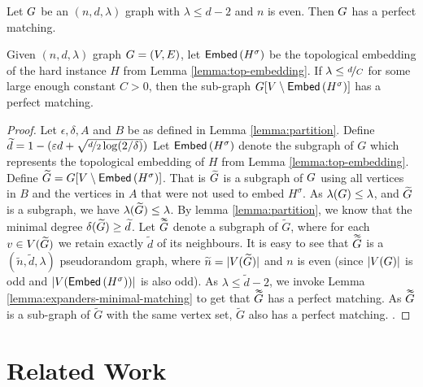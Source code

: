 \documentclass[11pt]{article}
\newcommand{\EnDeeLambda}{(n, d, \lambda)}
\newcommand{\Subdivision}[2]{{#1}^{#2}}
\newcommand{\MinimalDegree}[1]{\delta(#1)}
\newcommand{\dbtilde}[1]{\tilde{\raisebox{0pt}[0.85\height]{$\tilde{#1}$}}}
\newcommand{\ExpansionFactor}[1]{\lambda(#1)}
\begin{document}
\begin{lemma}\label{lemma:expanders-minimal-matching}
Let $\Graph$ be an $\EnDeeLambda$ graph with $\lambda \leq d - 2$	and $n$ is even. Then $\Graph$ has a perfect matching.
\end{lemma}

\begin{lemma}\label{lemma:perfect-matching}
Given $\EnDeeLambda$ graph $\Graph=(V,E)$, let $\Embedding{\Subdivision{H}{\sigma}}$ be the topological embedding of the hard instance $H$ from Lemma \ref{lemma:top-embedding}.
If $\lambda \leq \nicefrac{d}{C}$ for some large enough constant $C > 0$, then the sub-graph $\Graph[V \setminus \Embedding{\Subdivision{H}{\sigma}}]$ has a perfect matching.	
\end{lemma}

\begin{proof}
Let $\epsilon, \delta, A$ and $B$ be as defined in Lemma \ref{lemma:partition}.
Define $\tilde{d} = 1 - (\epsilon d + \sqrt{\nicefrac{d}{2}\log (2/\delta)})$
Let $\Embedding{\Subdivision{H}{\sigma}}$ denote the subgraph of $G$ which represents the topological embedding of $H$ from Lemma \ref{lemma:top-embedding}.
Define $\tilde{G} = \Graph[V \setminus \Embedding{\Subdivision{H}{\sigma}}]$. 
That is $\tilde{\Graph}$ is a subgraph of $\Graph$ using all vertices in $B$ and the vertices in $A$ that were not used to embed $\Subdivision{H}{\sigma}$.
As $\ExpansionFactor{\Graph} \leq \lambda$, and $\tilde{\Graph}$ is a subgraph, we have $\ExpansionFactor{\tilde{\Graph}} \leq \lambda$.
By lemma \ref{lemma:partition}, we know that the minimal degree $\MinimalDegree{\tilde{\Graph}} \geq \tilde{d}$.
Let $\dbtilde{\Graph}$ denote a subgraph of $\tilde{G}$, where for each $v \in \Vertices{\tilde{\Graph}}$ we retain exactly $\tilde{d}$ of its neighbours.
It is easy to see that $\dbtilde{\Graph}$ is a $(\tilde{n}, \tilde{d}, \lambda)$ pseudorandom graph, where $\tilde{n} = |\Vertices{\tilde{\Graph}}|$ and $n$ is even (since $|\Vertices{\Graph}|$ is odd and $|\Vertices{\Embedding{\Subdivision{H}{\sigma}}}|$ is also odd). 
As $\lambda \leq \tilde{d} - 2$, we invoke Lemma \ref{lemma:expanders-minimal-matching} to get that $\dbtilde{G}$ has a perfect matching.
As $\dbtilde{G}$ is a sub-graph of $\tilde{G}$ with the same vertex set, $\tilde{G}$ also has a perfect matching.
.
\end{proof}

\section{Related Work}

\clearpage


\end{document}
